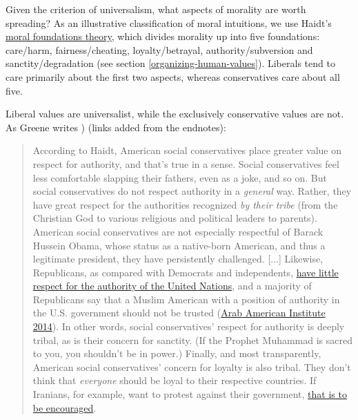 Given the criterion of universalism, what aspects of morality are worth
spreading? As an illustrative classification of moral intuitions, we use
Haidt's
\href{https://en.wikipedia.org/wiki/Moral_foundations_theory}{moral
foundations theory}, which divides morality up into five foundations:
care/harm, fairness/cheating, loyalty/betrayal, authority/subversion and
sanctity/degradation (see section
\ref{organizing-human-values}). Liberals tend to care primarily about the first two
aspects, whereas conservatives care about all five.

Liberal values are universalist, while the exclusively conservative
values are not. As Greene writes \citeyear{Greene2013-sq}) (links
added from the endnotes):

\begin{quote}
According to Haidt, American social conservatives place greater value on
respect for authority, and that's true in a sense. Social conservatives
feel less comfortable slapping their fathers, even as a joke, and so on.
But social conservatives do not respect authority in a \emph{general}
way. Rather, they have great respect for the authorities recognized
\emph{by their tribe} (from the Christian God to various religious and
political leaders to parents). American social conservatives are not
especially respectful of Barack Hussein Obama, whose status as a
native-born American, and thus a legitimate president, they have
persistently challenged. {[}...{]} Likewise, Republicans, as compared
with Democrats and independents,
\href{http://www.pewglobal.org/2009/09/21/obama-addresses-more-popular-un/}{have
little respect for the authority of the United Nations}, and a majority
of Republicans say that a Muslim American with a position of authority
in the U.S. government should not be trusted
(\href{http://b.3cdn.net/aai/3e05a493869e6b44b0_76m6iyjon.pdf}{Arab
American Institute 2014}). In other words, social conservatives'
respect for authority is deeply tribal, as is their concern for
sanctity. (If the Prophet Muhammad is sacred to you, you shouldn't be in
power.) Finally, and most transparently, American social conservatives'
concern for loyalty is also tribal. They don't think that
\emph{everyone} should be loyal to their respective countries. If
Iranians, for example, want to protest against their government,
\href{http://www.cbsnews.com/news/gop-hits-obama-for-silence-on-iran-protests/}{that
is to be encouraged}.
\end{quote}

